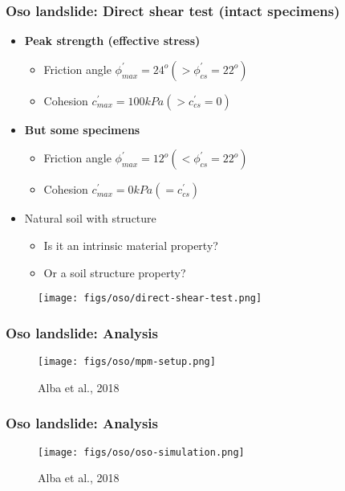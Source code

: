 \documentclass[notes]{beamer}
\begin{document}
\begin{frame}
	\frametitle{Oso landslide: Direct shear test (intact specimens)}
	\noindent
	\fboxsep=0pt
	\noindent
	\begin{minipage}[t]{0.65\linewidth}
		\begin{itemize}
			\item \textbf{Peak strength (effective stress)}
			\begin{itemize}
				\item Friction angle $\phi^\prime_{max} = 24^o (> \phi^\prime_{cs} = 22^o)$
				\item Cohesion $c^\prime_{max} = 100 kPa (> c^\prime_{cs} = 0)$
			\end{itemize}
				\item \textbf{But some specimens}
			\begin{itemize}
				\item Friction angle $\phi^\prime_{max} = 12^o (< \phi^\prime_{cs} = 22^o)$
				\item Cohesion $c^\prime_{max} = 0 kPa ( = c^\prime_{cs})$
			\end{itemize}
			\item Natural soil with structure
			\begin{itemize}
				\item Is it an intrinsic material property?
				\item Or a soil structure property?
			\end{itemize}
		\end{itemize}
		
	\end{minipage}%
	\hfill
	\begin{minipage}[t]{0.35\linewidth}
	\begin{figure}
		\texttt{[image: figs/oso/direct-shear-test.png]}
	\end{figure}
	\end{minipage}	
\end{frame}

\begin{frame}
	\frametitle{Oso landslide: Analysis}
	\begin{figure}
		\texttt{[image: figs/oso/mpm-setup.png]}
		\caption*{Alba et al., 2018}
	\end{figure}
\end{frame}

\begin{frame}
	\frametitle{Oso landslide: Analysis}
	\begin{figure}
		\texttt{[image: figs/oso/oso-simulation.png]}
		\caption*{Alba et al., 2018}
	\end{figure}
\end{frame}
\end{document}

